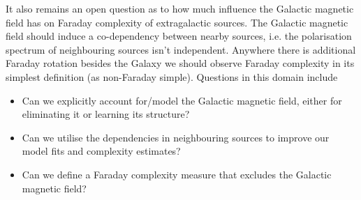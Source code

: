 \documentclass[a4paper]{article}
\begin{document}
    It also remains an open question as to how much influence the Galactic magnetic field has on Faraday complexity of extragalactic sources. The Galactic magnetic field should induce a co-dependency between nearby sources, i.e. the polarisation spectrum of neighbouring sources isn't independent. Anywhere there is additional Faraday rotation besides the Galaxy we should observe Faraday complexity in its simplest definition (as non-Faraday simple). Questions in this domain include
    \begin{itemize}
        \item Can we explicitly account for/model the Galactic magnetic field, either for eliminating it or learning its structure?
        \item Can we utilise the dependencies in neighbouring sources to improve our model fits and complexity estimates?
        \item Can we define a Faraday complexity measure that excludes the Galactic magnetic field?
    \end{itemize}

    
\end{document}
